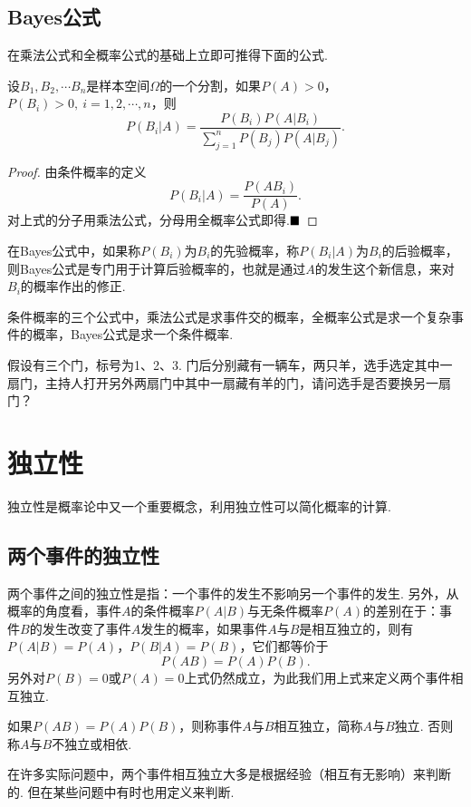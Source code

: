 \subsection{Bayes公式}
在乘法公式和全概率公式的基础上立即可推得下面的公式.
\begin{theorem}[Bayes公式]
	设$B_1,B_2,\cdots B_n$是样本空间$\varOmega$的一个分割，如果$P(A)>0$，$P(B_i)>0,\ i=1,2,\cdots,n$，则
	$$P(B_i|A)=\frac{P(B_i)P(A|B_i)}{\displaystyle\sum\limits_{j=1}^{n}P(B_j)P(A|B_j)}.$$
\end{theorem}
\begin{proof}
	由条件概率的定义
	$$P(B_i|A)=\frac{P(AB_i)}{P(A)}.$$
	对上式的分子用乘法公式，分母用全概率公式即得.$\hfill\blacksquare$
\end{proof}
\begin{remark}
	在Bayes公式中，如果称$P(B_i)$为$B_i$的{\heiti 先验概率}，称$P(B_i|A)$为$B_i$的{\heiti 后验概率}，则Bayes公式是专门用于计算后验概率的，也就是通过$A$的发生这个新信息，来对$B_i$的概率作出的修正.
\end{remark}

条件概率的三个公式中，乘法公式是求事件交的概率，全概率公式是求一个复杂事件的概率，Bayes公式是求一个条件概率.

\begin{example}
	假设有三个门，标号为1、2、3. 门后分别藏有一辆车，两只羊，选手选定其中一扇门，主持人打开另外两扇门中其中一扇藏有羊的门，请问选手是否要换另一扇门？
\end{example}

\begin{solution}
	
\end{solution}

\section{独立性}
独立性是概率论中又一个重要概念，利用独立性可以简化概率的计算.
\subsection{两个事件的独立性}
两个事件之间的独立性是指：一个事件的发生不影响另一个事件的发生. 另外，从概率的角度看，事件$A$的条件概率$P(A|B)$与无条件概率$P(A)$的差别在于：事件$B$的发生改变了事件$A$发生的概率，如果事件$A$与$B$是相互独立的，则有$P(A|B)=P(A)$，$P(B|A)=P(B)$，它们都等价于
$$P(AB)=P(A)P(B).$$
另外对$P(B)=0$或$P(A)=0$上式仍然成立，为此我们用上式来定义两个事件相互独立.
\begin{definition}[独立]
	如果$P(AB)=P(A)P(B)$，则称事件$A$与$B${\heiti 相互独立}，简称$A$与$B${\heiti 独立}. 否则称$A$与$B${\heiti 不独立}或{\heiti 相依}.
\end{definition}
在许多实际问题中，两个事件相互独立大多是根据经验（相互有无影响）来判断的. 但在某些问题中有时也用定义来判断.

